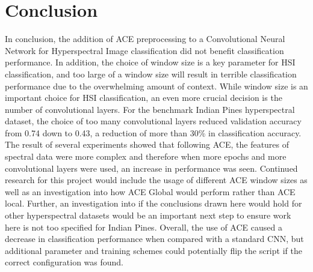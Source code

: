 \documentclass[12pt]{article}
\begin{document}
\section{Conclusion}\label{sec:conclusion}
In conclusion, the addition of ACE preprocessing to a Convolutional Neural Network for Hyperspectral Image classification did not benefit classification performance. 
%
In addition, the choice of window size is a key parameter for HSI classification, and too large of a window size will result in terrible classification performance due to the overwhelming amount of context. 
%
While window size is an important choice for HSI classification, an even more crucial decision is the number of convolutional layers.
%
For the benchmark Indian Pines hyperspectral dataset, the choice of too many convolutional layers reduced validation accuracy from 0.74 down to 0.43, a reduction of more than 30\% in classification accuracy.
%
The result of several experiments showed that following ACE, the features of spectral data were more complex and therefore when more epochs and more convolutional layers were used, an increase in performance was seen.
%
Continued research for this project would include the usage of different ACE window sizes as well as an investigation into how ACE Global would perform rather than ACE local.
%
Further, an investigation into if the conclusions drawn here would hold for other hyperspectral datasets would be an important next step to ensure work here is not too specified for Indian Pines.
%
Overall, the use of ACE caused a decrease in classification performance when compared with a standard CNN, but additional parameter and training schemes could potentially flip the script if the correct configuration was found.



 

\end{document}
